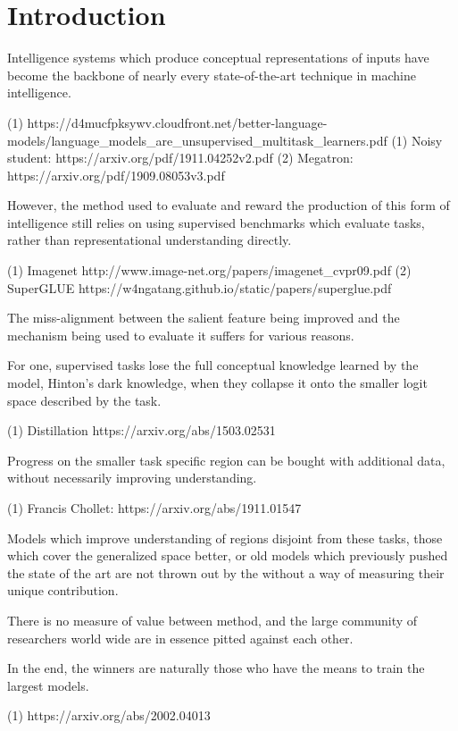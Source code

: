 \documentclass{article}
\begin{document}
\section{Introduction}

Intelligence systems which produce conceptual representations of inputs have become the backbone of nearly every state-of-the-art technique in machine intelligence.

(1) https://d4mucfpksywv.cloudfront.net/better-language-models/language_models_are_unsupervised_multitask_learners.pdf
(1) Noisy student: https://arxiv.org/pdf/1911.04252v2.pdf
(2) Megatron: https://arxiv.org/pdf/1909.08053v3.pdf

However, the method used to evaluate and reward the production of this form of intelligence still relies on using supervised benchmarks which evaluate tasks, rather than representational understanding directly. 

(1) Imagenet http://www.image-net.org/papers/imagenet_cvpr09.pdf
(2) SuperGLUE https://w4ngatang.github.io/static/papers/superglue.pdf

The miss-alignment between the salient feature being improved and the mechanism being used to evaluate it suffers for various reasons. 

For one, supervised tasks lose the full conceptual knowledge learned by the model, Hinton's dark knowledge, when they collapse it onto the smaller logit space described by the task.

(1) Distillation https://arxiv.org/abs/1503.02531

Progress on the smaller task specific region can be bought with additional data, without necessarily improving understanding.

(1) Francis Chollet: https://arxiv.org/abs/1911.01547

Models which improve understanding of regions disjoint from these tasks, those which cover the generalized space better, or old models which previously pushed the state of the art are not thrown out by the without a way of measuring their unique contribution.

There is no measure of value between method, and the large community of researchers 
world wide are in essence pitted against each other. 

In the end, the winners are naturally those who have the means to train the largest models.

(1) https://arxiv.org/abs/2002.04013
\end{document}

